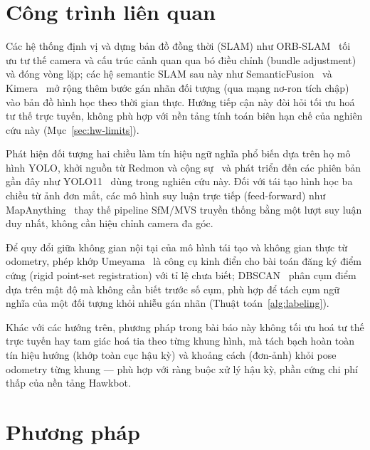 \documentclass[10pt,a4paper,twocolumn]{article}
\begin{document}
\section{Công trình liên quan}

Các hệ thống định vị và dựng bản đồ đồng thời (SLAM) như ORB-SLAM~\cite{orbslam} tối ưu tư thế camera và cấu trúc cảnh quan qua bó điều chỉnh (bundle adjustment) và đóng vòng lặp; các hệ semantic SLAM sau này như SemanticFusion~\cite{semanticfusion} và Kimera~\cite{kimera} mở rộng thêm bước gán nhãn đối tượng (qua mạng nơ-ron tích chập) vào bản đồ hình học theo thời gian thực. Hướng tiếp cận này đòi hỏi tối ưu hoá tư thế trực tuyến, không phù hợp với nền tảng tính toán biên hạn chế của nghiên cứu này (Mục~\ref{sec:hw-limits}).

Phát hiện đối tượng hai chiều làm tín hiệu ngữ nghĩa phổ biến dựa trên họ mô hình YOLO, khởi nguồn từ Redmon và cộng sự~\cite{yolo} và phát triển đến các phiên bản gần đây như YOLO11~\cite{yolo11} dùng trong nghiên cứu này. Đối với tái tạo hình học ba chiều từ ảnh đơn mắt, các mô hình suy luận trực tiếp (feed-forward) như MapAnything~\cite{mapanything} thay thế pipeline SfM/MVS truyền thống bằng một lượt suy luận duy nhất, không cần hiệu chỉnh camera đa góc.

Để quy đổi giữa không gian nội tại của mô hình tái tạo và không gian thực từ odometry, phép khớp Umeyama~\cite{umeyama} là công cụ kinh điển cho bài toán đăng ký điểm cứng (rigid point-set registration) với tỉ lệ chưa biết; DBSCAN~\cite{dbscan} phân cụm điểm dựa trên mật độ mà không cần biết trước số cụm, phù hợp để tách cụm ngữ nghĩa của một đối tượng khỏi nhiễu gán nhãn (Thuật toán~\ref{alg:labeling}).

Khác với các hướng trên, phương pháp trong bài báo này không tối ưu hoá tư thế trực tuyến hay tam giác hoá tia theo từng khung hình, mà tách bạch hoàn toàn tín hiệu hướng (khớp toàn cục hậu kỳ) và khoảng cách (đơn-ảnh) khỏi pose odometry từng khung — phù hợp với ràng buộc xử lý hậu kỳ, phần cứng chi phí thấp của nền tảng Hawkbot.

\section{Phương pháp}
\end{document}
